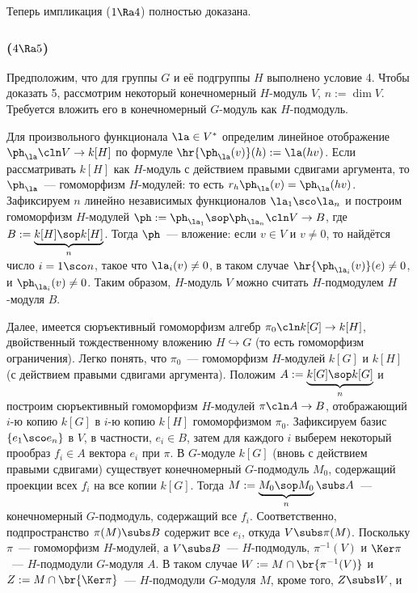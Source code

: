 \documentclass{article}
\newcommand{\hookra}{\hookrightarrow}
\begin{document}
Теперь импликация ($1\Ra4$) полностью доказана.

\subsubsection{($4\Ra5$)}

Предположим, что для группы $G$ и её подгруппы $H$ выполнено условие 4. Чтобы доказать 5, рассмотрим некоторый
конечномерный $H$-модуль $V$, $n:=\dim V$. Требуется вложить его в конечномерный $G$-модуль как $H$-подмодуль.

Для произвольного функционала $\la\in V^*$ определим линейное отображение $\ph_{\la}\cln V\to k[H]$ по формуле
$\hr{\ph_{\la}(v)}(h):=\la(hv)$. Если рассматривать $k[H]$ как $H$-модуль с действием правыми сдвигами аргумента,
то $\ph_{\la}$~--- гомоморфизм $H$-модулей:  то есть
$r_h\ph_{\la}(v)=\ph_{\la}(hv)$. Зафиксируем $n$ линейно независимых функционалов $\la_1\sco\la_n$ и построим
гомоморфизм $H$-модулей $\ph:=\ph_{\la_1}\sop\ph_{\la_n}\cln V\to B$, где $B:=\underbrace{k[H]\sop k[H]}_n$. Тогда
$\ph$~--- вложение: если $v\in V$ и $v\ne0$, то найдётся число $i=1\sco n$, такое что $\la_i(v)\ne0$, в таком
случае $\hr{\ph_{\la_i}(v)}(e)\ne0$, и $\ph_{\la_i}(v)\ne0$. Таким образом, $H$-модуль $V$ можно считать
$H$-подмодулем $H$-модуля $B$.

Далее, имеется сюръективный гомоморфизм алгебр $\pi_0\cln k[G]\to k[H]$, двойственный тождественному вложению
$H\hookra G$ (то есть гомоморфизм ограничения). Легко понять, что $\pi_0$~--- гомоморфизм $H$-модулей $k[G]$ и
$k[H]$ (с действием правыми сдвигами аргумента). Положим $A:=\underbrace{k[G]\sop k[G]}_n$ и построим сюръективный
гомоморфизм $H$-модулей $\pi\cln A\to B$, отображающий $i$-ю копию $k[G]$ в $i$-ю копию $k[H]$ гомоморфизмом
$\pi_0$. Зафиксируем базис $\{e_1\sco e_n\}$ в $V$, в частности, $e_i\in B$, затем для каждого $i$ выберем
некоторый прообраз $f_i\in A$ вектора $e_i$ при $\pi$. В $G$-модуле $k[G]$ (вновь с действием правыми сдвигами)
существует конечномерный $G$-подмодуль $M_0$, содержащий проекции всех $f_i$ на все копии $k[G]$. Тогда
$M:=\underbrace{M_0\sop M_0}_n\subs A$~--- конечномерный $G$-подмодуль, содержащий все $f_i$. Соответственно,
подпространство $\pi(M)\subs B$ содержит все $e_i$, откуда $V\subs\pi(M)$. Поскольку $\pi$~--- гомоморфизм
$H$-модулей, а $V\subs B$~--- $H$-подмодуль, $\pi^{-1}(V)$ и $\Ker\pi$~--- $H$-подмодули $G$-модуля $A$. В таком
случае $W:=M\cap\br{\pi^{-1}(V)}$ и $Z:=M\cap\br{\Ker\pi}$~--- $H$-подмодули $G$-модуля $M$, кроме того, $Z\subs
W$, и 
\end{document}
